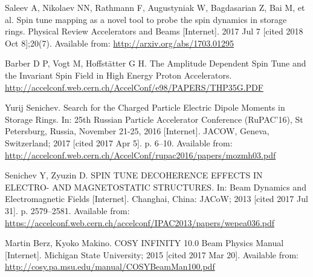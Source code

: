 \documentclass{article}
\begin{document}
    
  


\begin{thebibliography}{99}
  Saleev A, Nikolaev NN, Rathmann F, Augustyniak W, Bagdasarian Z, Bai M, et al. Spin tune mapping as a novel tool to probe the spin dynamics in storage rings. Physical Review Accelerators and Beams [Internet]. 2017 Jul 7 [cited 2018 Oct 8];20(7). Available from: \url{http://arxiv.org/abs/1703.01295}
  
  Barber D P, Vogt M, Hoffst\"atter G H. The Amplitude Dependent Spin Tune and the Invariant Spin Field in High Energy Proton Accelerators. \url{http://accelconf.web.cern.ch/AccelConf/e98/PAPERS/THP35G.PDF}

  Yurij Senichev. Search for the Charged Particle Electric Dipole Moments in Storage Rings. In: 25th Russian Particle Accelerator Conference (RuPAC’16), St Petersburg, Russia, November 21-25, 2016 [Internet]. JACOW, Geneva, Switzerland; 2017 [cited 2017 Apr 5]. p. 6–10. Available from: \url{http://accelconf.web.cern.ch/AccelConf/rupac2016/papers/mozmh03.pdf}

  Senichev Y, Zyuzin D. SPIN TUNE DECOHERENCE EFFECTS IN ELECTRO- AND  MAGNETOSTATIC STRUCTURES. In: Beam Dynamics and Electromagnetic Fields [Internet]. Changhai, China: JACoW; 2013 [cited 2017 Jul 31]. p. 2579--2581. Available from: \url{https://accelconf.web.cern.ch/accelconf/IPAC2013/papers/wepea036.pdf}

  Martin Berz, Kyoko Makino. COSY INFINITY 10.0 Beam Physics Manual [Internet]. Michigan State University; 2015 [cited 2017 Mar 20]. Available from: \url{http://cosy.pa.msu.edu/manual/COSYBeamMan100.pdf}

\end{thebibliography}
\end{document}
